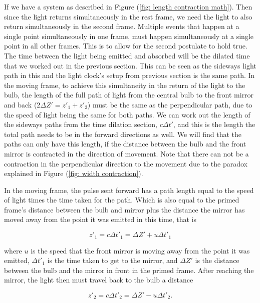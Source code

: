 If we have a system as described in Figure (\ref{fig: length contraction math}).
Then since the light returns simultaneously in the rest frame, we need the light to also return simultaneously in the second frame.
Multiple events that happen at a single point simultaneously in one frame, must happen simultaneously at a single point in all other frames.
This is to allow for the second postulate to hold true.
The time between the light being emitted and absorbed will be the dilated time that we worked out in the previous section.
This can be seen as the sideways light path in this and the light clock's setup from previous section is the same path.
In the moving frame, to achieve this simultaneity in the return of the light to the bulb, the length of the full path of light from the central bulb to the front mirror and back ($2 {\Delta Z'} = {z'_1} + {z'_2}$) must be the same as the perpendicular path, due to the speed of light being the same for both paths.
We can work out the length of the sideways paths from the time dilation section, ${c}{\Delta t'}$, and this is the length the total path needs to be in the forward directions as well.
We will find that the paths can only have this length, if the distance between the bulb and the front mirror is contracted in the direction of movement.
Note that there can not be a contraction in the perpendicular direction to the movement due to the paradox explained in Figure (\ref{fig: width contraction}).

In the moving frame, the pulse sent forward has a path length equal to the speed of light times the time taken for the path.
Which is also equal to the primed frame's distance between the bulb and mirror plus the distance the mirror has moved away from the point it was emitted in this time, that is

\begin{equation}
	{z'_1} = {c}{\Delta t'_1} = {\Delta  Z'} + {u} {\Delta t'_1}
\end{equation}

where ${u}$ is the speed that the front mirror is moving away from the point it was emitted, ${\Delta t'_1}$ is the time taken to get to the mirror, and ${\Delta  Z'}$ is the distance between the bulb and the mirror in front in the primed frame.
After reaching the mirror, the light then must travel back to the bulb a distance

\begin{equation}
	{z'_2} = {c} {\Delta t'_2} = {\Delta  Z'} - {u} {\Delta t'_2}.
\end{equation}

